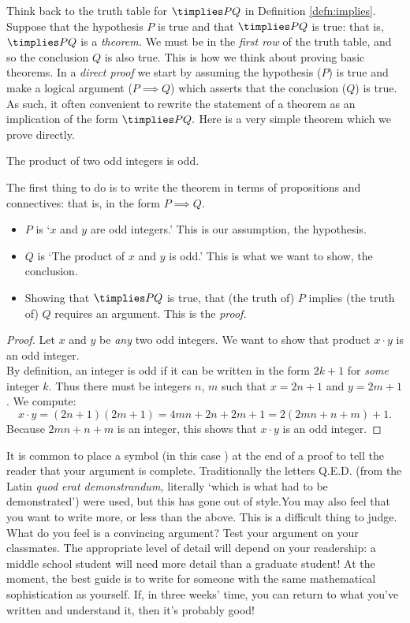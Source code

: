 \noindent Think back to the truth table for $\timplies PQ$ in Definition \ref{defn:implies}. Suppose that the hypothesis $P$ is true and that $\timplies PQ$ is true: that is, $\timplies PQ$ is a \emph{theorem.} We must be in the \emph{first row} of the truth table, and so the conclusion $Q$ is also true. This is how we think about proving basic theorems. In a \emph{direct proof} we start by assuming the hypothesis ($P$) is true and make a logical argument ($P\implies Q$) which asserts that the conclusion ($Q$) is true. As such, it often convenient to rewrite the statement of a theorem as an implication of the form $\timplies P{Q.}$ Here is a very simple theorem which we prove directly. 

\begin{thm}
The product of two odd integers is odd.
\end{thm}

\noindent The first thing to do is to write the theorem in terms of propositions and connectives: that is, in the form $P\implies Q$.
\begin{itemize}
  \item $P$ is `$x$ and $y$ are odd integers.' This is our assumption, the hypothesis.
  \item $Q$ is `The product of $x$ and $y$ is odd.' This is what we want to show, the conclusion.
  \item Showing that $\timplies PQ$ is true, that (the truth of) $P$ implies (the truth of) $Q$ requires an argument. This is the \emph{proof.}
\end{itemize}

\begin{proof}
Let $x$ and $y$ be \emph{any} two odd integers. We want to show that product $x\cdot y$ is an odd integer. \\
By definition, an integer is odd if it can be written in the form $2k+1$ for \emph{some} integer $k$. Thus there must be integers $n$, $m$ such that $x=2n+1$ and $y=2m+1$. We compute:
\[x\cdot y=(2n+1)(2m+1)=4mn+2n+2m+1=2(2mn+n+m)+1.\]
Because $2mn+n+m$ is an integer, this shows that $x\cdot y$ is an odd integer.
\end{proof}

\noindent It is common to place a symbol (in this case \smash{\raisebox{7pt}{$\qedsymbol$}}) at the end of a proof to tell the reader that your argument is complete. Traditionally the letters Q.E.D. (from the Latin \emph{quod erat demonstrandum,} literally `which is what had to be demonstrated') were used, but this has gone out of style.You may also feel that you want to write more, or less than the above. This is a difficult thing to judge. What do you feel is a convincing argument? Test your argument on your classmates. The appropriate level of detail will depend on your readership: a middle school student will need more detail than a graduate student! At the moment, the best guide is to write for someone with the same mathematical sophistication as yourself. If, in three weeks' time, you can return to what you've written and understand it, then it's probably good!


